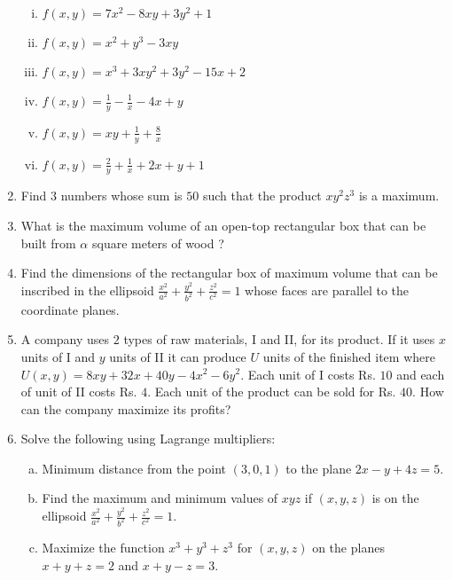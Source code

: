 \documentclass[journal,12pt,twocolumn]{IEEEtran}
\begin{document}
\begin{enumerate}
\begin{enumerate}[(i)]
\item $
f(x,y)=7x^2-8xy+3y^2+1
$

\item $
f(x,y)=x^2+y^3-3xy
$

\item $
f(x,y)=x^3+3xy^2+3y^2-15x+2 
$

\item $
f(x,y)=\frac{1}{y}-\frac{1}{x}-4x+y
$

\item $
f(x,y)=xy+\frac{1}{y}+\frac{8}{x}
$

\item $
f(x,y)=\frac{2}{y}+\frac{1}{x}+2x+y+1
$


\end{enumerate}

\item Find $3$ numbers whose sum is $50$ such that the product $xy^2z^3$ is a maximum.

\item What is the maximum volume of an open-top rectangular box that can be built from $\alpha$ square
meters of wood ?

\item Find the dimensions of the rectangular box of maximum volume that can be inscribed in the ellipsoid $\frac{x^2}{a^2}+\frac{y^2}{b^2}+\frac{z^2}{c^2}=1$ whose faces are parallel to the coordinate planes.

\item A company uses $2$ types of raw materials, I and II, for its product. If it uses $x$ units of I and $y$ units of II it can produce $U$ units of the finished item where $U(x,y)=8xy+32x+40y-4x^2-6y^2$.
Each unit of I costs Rs. $10$ and each of unit of II costs Rs. $4$. Each unit of the product can be sold for Rs. $40$. How can the company maximize its profits?

\item Solve the following using Lagrange multipliers:

\begin{enumerate}[(a)]

\item Minimum distance from the point $(3,0,1)$  to the plane $2x-y+4z=5$.

\item Find the maximum and minimum values of $xyz$ if $(x,y,z)$ is on the ellipsoid $\frac{x^2}{a^2}+\frac{y^2}{b^2}+\frac{z^2}{c^2}=1$.

\item Maximize the function $x^3+y^3+z^3$ for $(x,y,z)$ on the planes $x+y+z=2$ and $x+y-z=3$.


\end{enumerate}
\end{enumerate}
\end{document}
